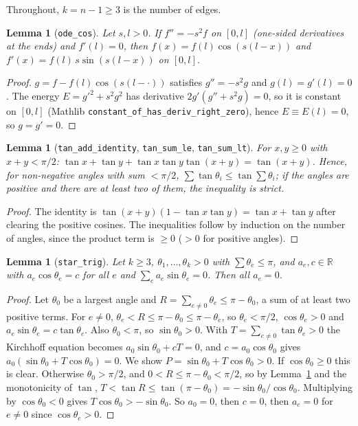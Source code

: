\documentclass[11pt]{article}
\newtheorem{lemma}[theorem]{Lemma}
\theoremstyle{definition}
\theoremstyle{remark}
\begin{document}
Throughout, $k=n-1\ge 3$ is the number of edges.

\begin{lemma}[\texttt{ode\_cos}]\label{ode}
Let $s,l>0$. If $f''=-s^2f$ on $[0,l]$ (one-sided derivatives at the ends) and $f'(l)=0$, then
$f(x)=f(l)\cos(s(l-x))$ and $f'(x)=f(l)\,s\sin(s(l-x))$ on $[0,l]$.
\end{lemma}
\begin{proof}
$g=f-f(l)\cos(s(l-\cdot))$ satisfies $g''=-s^2g$ and $g(l)=g'(l)=0$. The energy
$E=g'^2+s^2g^2$ has derivative $2g'(g''+s^2g)=0$, so it is constant on $[0,l]$ (Mathlib
\texttt{constant\_of\_has\_deriv\_right\_zero}), hence $E\equiv E(l)=0$, so $g=g'=0$.
\end{proof}

\begin{lemma}[\texttt{tan\_add\_identity}, \texttt{tan\_sum\_le}, \texttt{tan\_sum\_lt}]\label{tan}
For $x,y\ge 0$ with $x+y<\pi/2$: $\tan x+\tan y+\tan x\tan y\tan(x+y)=\tan(x+y)$. Hence, for
non-negative angles with sum $<\pi/2$, $\sum\tan\theta_i\le\tan\sum\theta_i$; if the angles are
positive and there are at least two of them, the inequality is strict.
\end{lemma}
\begin{proof}
The identity is $\tan(x+y)(1-\tan x\tan y)=\tan x+\tan y$ after clearing the positive cosines. The
inequalities follow by induction on the number of angles, since the product term is $\ge 0$ ($>0$ for
positive angles).
\end{proof}

\begin{lemma}[\texttt{star\_trig}]\label{trig}
Let $k\ge 3$, $\theta_1,\dots,\theta_k>0$ with $\sum\theta_e\le\pi$, and $a_e,c\in\mathbb{R}$ with
$a_e\cos\theta_e=c$ for all $e$ and $\sum_e a_e\sin\theta_e=0$. Then all $a_e=0$.
\end{lemma}
\begin{proof}
Let $\theta_0$ be a largest angle and $R=\sum_{e\ne 0}\theta_e\le\pi-\theta_0$, a sum of at least
two positive terms. For $e\ne 0$, $\theta_e<R\le\pi-\theta_0\le\pi-\theta_e$, so
$\theta_e<\pi/2$, $\cos\theta_e>0$ and $a_e\sin\theta_e=c\tan\theta_e$. Also $\theta_0<\pi$, so
$\sin\theta_0>0$. With $T=\sum_{e\ne 0}\tan\theta_e>0$ the Kirchhoff equation becomes
$a_0\sin\theta_0+cT=0$, and $c=a_0\cos\theta_0$ gives $a_0(\sin\theta_0+T\cos\theta_0)=0$. We show
$P=\sin\theta_0+T\cos\theta_0>0$. If $\cos\theta_0\ge 0$ this is clear. Otherwise
$\theta_0>\pi/2$, and $0<R\le\pi-\theta_0<\pi/2$, so by Lemma~\ref{tan} and the monotonicity of
$\tan$, $T<\tan R\le\tan(\pi-\theta_0)=-\sin\theta_0/\cos\theta_0$. Multiplying by
$\cos\theta_0<0$ gives $T\cos\theta_0>-\sin\theta_0$. So $a_0=0$, then $c=0$, then $a_e=0$ for
$e\ne 0$ since $\cos\theta_e>0$.
\end{proof}
\end{document}
